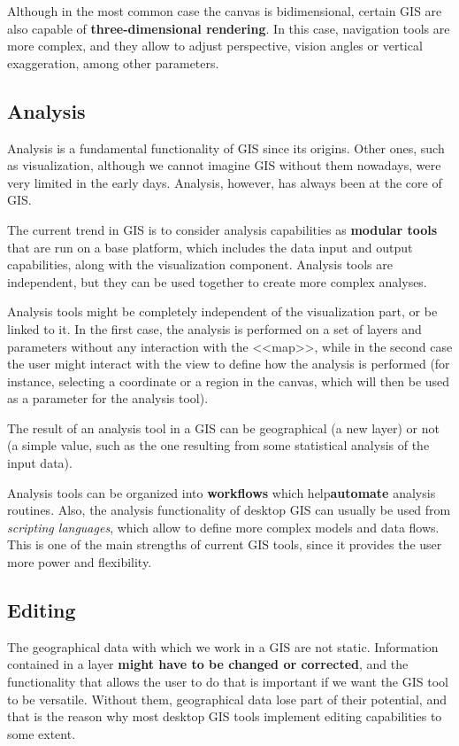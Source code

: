 Although in the most common case the canvas is bidimensional, certain GIS are also capable of \textbf{three-dimensional rendering}. In this case, navigation tools are more complex, and they allow to adjust perspective, vision angles or vertical exaggeration, among other parameters.

\subsection{Analysis}

Analysis is a fundamental functionality of GIS since its origins. Other ones, such as visualization, although we cannot imagine GIS without them nowadays, were very limited in the early days. Analysis, however, has always been at the core of GIS.

The current trend in GIS is to consider analysis capabilities as \textbf{modular tools} that are run on a base platform, which includes the data input and output capabilities, along with the visualization component. Analysis tools are independent, but they can be used together to create more complex analyses.

Analysis tools might be completely independent of the visualization part, or be linked to it. In the first case, the analysis is performed on a set of layers and parameters without any interaction with the <<map>>, while in the second case the user might interact with the view to define how the analysis is performed (for instance, selecting a coordinate or a region in the canvas, which will then be used as a parameter for the analysis tool).

The result of an analysis tool in a GIS can be geographical (a new layer) or not (a simple value, such as the one resulting from some statistical analysis of the input data).

Analysis tools can be organized into \textbf{workflows} which help\textbf{automate} analysis routines. Also, the analysis functionality of desktop GIS can usually be used from \emph{scripting languages}, which allow to define more complex models and data flows. This is one of the main strengths of current GIS tools, since it provides the user more power and flexibility.

\subsection{Editing}

The geographical data with which we work in a GIS are not static. Information contained in a layer \textbf{might have to be changed or corrected}, and the functionality that allows the user to do that is important if we want the GIS tool to be versatile. Without them, geographical data lose part of their potential, and that is the reason why most desktop GIS tools implement editing capabilities to some extent.

